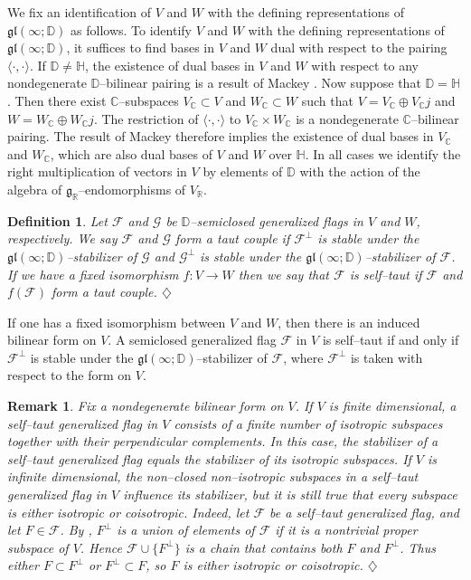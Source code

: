\documentclass[oneside,leqno,11pt]{article}
\def\gg{\mathfrak{g}}
\def\ggl{\mathfrak{gl}}
\def\C{\mathbb{C}}
\def\D{\mathbb{D}}
\def\H{\mathbb{H}}
\def\R{\mathbb{R}}
\def\cF{\mathcal{F}}
\def\cG{\mathcal{G}}
\newtheorem{definition}[equation]{Definition}
\newtheorem{remark}[equation]{Remark}
\begin{document}
We fix an identification of $V$ and $W$ with the defining representations of $\ggl(\infty;\D)$ as follows.  
To identify $V$ and $W$ with the defining representations of $\ggl(\infty;\D)$, it suffices to find bases in $V$ and $W$ dual with respect to the pairing $\langle \cdot, \cdot \rangle$.  If $\D \neq \H$, the existence of dual bases in $V$ and $W$ with respect to any nondegenerate $\D$--bilinear pairing is a result of Mackey \cite[p. 171]{M}.  Now suppose that $\D = \H$.  Then there exist $\C$--subspaces $V_\C \subset V$ and $W_\C \subset W$ such that $V = V_\C \oplus V_\C j$ and $W = W_\C \oplus W_\C j$.  The restriction of $\langle \cdot , \cdot \rangle$ to $V_\C \times W_\C$ is a nondegenerate $\C$--bilinear pairing.  The result of Mackey 
therefore implies the existence of dual bases in $V_\C$ and $W_\C$, which are also dual bases of $V$ and $W$ over $\H$.  In all cases we identify the right
multiplication of vectors in $V$ by elements of $\D$ with the action of the
algebra of $\gg_\R$--endomorphisms of $V_\R$.


\begin{definition}\label{def-selftaut} {\rm \cite{DC2}}
Let $\cF$ and $\cG$ be $\D$--semiclosed generalized flags in $V$ and $W$,
respectively.  We say $\cF$ and $\cG$ form a \emph{taut couple}
if $\cF^\perp$ is stable under the $\ggl(\infty;\D)$--stabilizer of $\cG$
and $\cG^\perp$ is stable under the $\ggl(\infty;\D)$--stabilizer of $\cF$.
If we have a fixed isomorphism 
 $f : V \rightarrow W$ then we say that $\cF$ is
self--taut if $\cF$ and $f(\cF)$ form a taut couple. 
\hfill $\diamondsuit$
\end{definition}


If one has a fixed isomorphism between $V$ and $W$, then there is an induced bilinear form on $V$.
A semiclosed generalized flag $\cF$ in $V$ is self--taut if and only if $\cF^\perp$ is stable under the $\ggl(\infty;\D)$--stabilizer of $\cF$, where $\cF^\perp$ is taken with respect to the form on $V$.


\begin{remark} \label{selftaut_is_biiso}  {\rm Fix a nondegenerate bilinear form on $V$.  If $V$ is finite dimensional, a self--taut generalized flag in $V$ consists of a finite number of isotropic subspaces together with their perpendicular complements.  In this case, the stabilizer of a self--taut generalized flag equals the stabilizer of its isotropic subspaces.  If $V$ is infinite dimensional, the non--closed non--isotropic subspaces in a self--taut generalized flag in $V$ influence its stabilizer, but it is still true that every subspace is either isotropic or coisotropic. 
Indeed, let $\cF$ be a self--taut generalized flag, and let $F \in \cF$. By \cite[Proposition 3.2]{DC2}, $F^\perp$ is a union
of elements of $\cF$ if it is a nontrivial proper subspace of $V$.  Hence $\cF \cup \{F^\perp\}$ is a chain that
contains both $F$ and $F^\perp$. Thus either $F \subset F^\perp$ or $F^\perp \subset F$, so $F$ is either isotropic or coisotropic.}
\hfill $\diamondsuit$
\end{remark}
\end{document}

